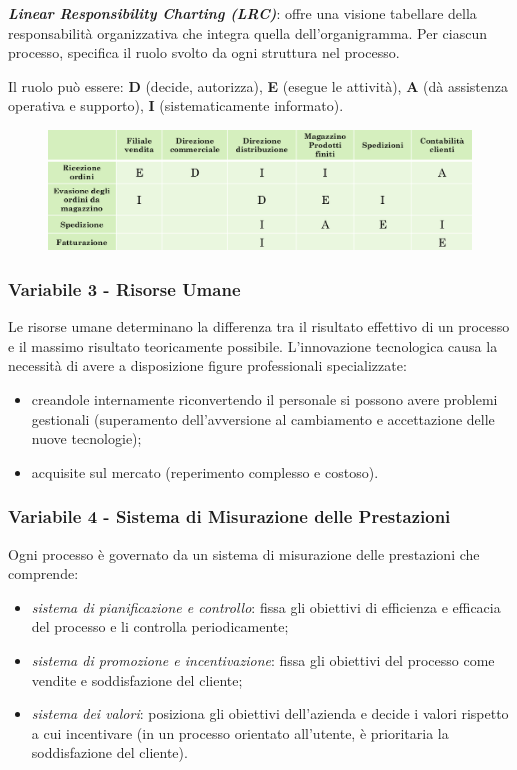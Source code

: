 \documentclass[a4paper, notitlepage, 9pt]{extreport}
\begin{document}
\begin{multicols}{2}
\textit{\textbf{Linear Responsibility Charting (LRC)}}: offre una visione tabellare della responsabilità organizzativa che integra quella dell’organigramma. Per ciascun processo, specifica il ruolo svolto da ogni struttura nel processo.

\noindent
Il ruolo può essere: \textbf{D} (decide, autorizza), \textbf{E} (esegue le attività), \textbf{A} (dà assistenza operativa e supporto), \textbf{I} (sistematicamente informato).
\columnbreak
\begin{figure}[H]
	\centering
	\includegraphics[scale=0.20]{LRC}
\end{figure}
\end{multicols}

\subsubsection*{Variabile 3 - Risorse Umane}
Le risorse umane determinano la differenza tra il risultato effettivo di un processo e il massimo risultato teoricamente possibile. L’innovazione tecnologica causa la necessità di avere a disposizione figure professionali specializzate:
\begin{itemize}
	\item creandole internamente riconvertendo il personale si possono avere problemi gestionali (superamento dell'avversione al cambiamento e accettazione delle nuove tecnologie);
	\item acquisite sul mercato (reperimento complesso e costoso).
\end{itemize}

\subsubsection*{Variabile 4 - Sistema di Misurazione delle Prestazioni}
Ogni processo è governato da un sistema di misurazione delle prestazioni che comprende:
\begin{itemize}
	\item \textit{sistema di pianificazione e controllo}: fissa gli obiettivi di efficienza e efficacia del processo e li controlla periodicamente;
	\item \textit{sistema di promozione e incentivazione}: fissa gli obiettivi del processo come vendite e soddisfazione del cliente;
	\item \textit{sistema dei valori}: posiziona gli obiettivi dell'azienda e decide i valori rispetto a cui incentivare (in un processo orientato all’utente, è prioritaria la soddisfazione del cliente).
\end{itemize}
\end{document}
